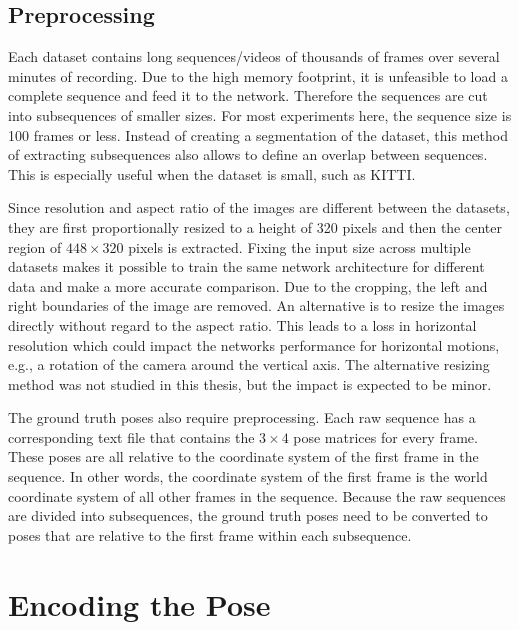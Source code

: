 		\subsection{Preprocessing}
			Each dataset contains long sequences/videos of thousands of frames over several minutes of recording.
			Due to the high memory footprint, it is unfeasible to load a complete sequence and feed it to the network.
			Therefore the sequences are cut into subsequences of smaller sizes. 
			For most experiments here, the sequence size is 100 frames or less.
			Instead of creating a segmentation of the dataset, this method of extracting subsequences also allows to define an overlap between sequences.
			This is especially useful when the dataset is small, such as KITTI.
			
			Since resolution and aspect ratio of the images are different between the datasets, they are first proportionally resized to a height of 320 pixels and then the center region of $448 \times 320$ pixels is extracted.
			Fixing the input size across multiple datasets makes it possible to train the same network architecture for different data and make a more accurate comparison.
			Due to the cropping, the left and right boundaries of the image are removed.
			An alternative is to resize the images directly without regard to the aspect ratio.
			This leads to a loss in horizontal resolution which could impact the networks performance for horizontal motions, e.g., a rotation of the camera around the vertical axis.
			The alternative resizing method was not studied in this thesis, but the impact is expected to be minor.
			
			The ground truth poses also require preprocessing. 
			Each raw sequence has a corresponding text file that contains the $3 \times 4$ pose matrices for every frame.
			These poses are all relative to the coordinate system of the first frame in the sequence.
			In other words, the coordinate system of the first frame is the world coordinate system of all other frames in the sequence.
			Because the raw sequences are divided into subsequences, the ground truth poses need to be converted to poses that are relative to the first frame within each subsequence.
			
			
	\section{Encoding the Pose}
	
	
